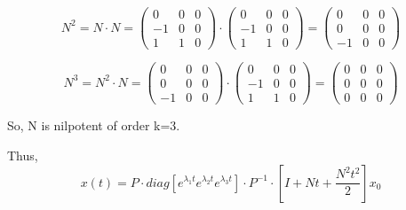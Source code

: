 \documentclass[12pt]{article}
\begin{document}
    $$
        N^2 = N\cdot N = 
        \begin{pmatrix}
            0  & 0 &  0\\
            -1 & 0 &  0\\
            1  & 1 &  0
        \end{pmatrix}\cdot
        \begin{pmatrix}
            0  & 0 &  0\\
            -1 & 0 &  0\\
            1  & 1 &  0
        \end{pmatrix} =
        \begin{pmatrix}
            0  & 0 &  0\\
            0 & 0 &  0\\
            -1  & 0 &  0
        \end{pmatrix}
    $$

    $$
        N^3 = N^2 \cdot N = 
        \begin{pmatrix}
            0  & 0 &  0\\
            0 & 0 &  0\\
            -1  & 0 &  0
        \end{pmatrix}\cdot
        \begin{pmatrix}
            0  & 0 &  0\\
            -1 & 0 &  0\\
            1  & 1 &  0
        \end{pmatrix} =
        \begin{pmatrix}
            0  & 0 &  0\\
            0  & 0 &  0\\
            0  & 0 &  0
        \end{pmatrix}
    $$

    So, N is nilpotent of order k=3.

    Thus,
    $$
        x(t)=P\cdot diag\left[e^{\lambda_1 t} e^{\lambda_2 t} e^{\lambda_3 t}\right]
        \cdot P^{-1}\cdot\left[I + Nt +\dfrac{N^2 t^2}{2}\right]x_0
    $$
\end{document}
